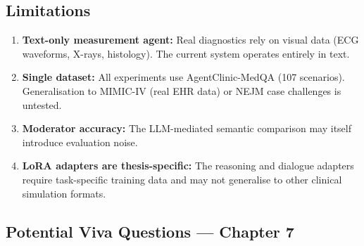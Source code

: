 \subsection{Limitations}

\begin{enumerate}
    \item \textbf{Text-only measurement agent:} Real diagnostics rely on visual data (ECG waveforms, X-rays, histology). The current system operates entirely in text.
    \item \textbf{Single dataset:} All experiments use AgentClinic-MedQA (107 scenarios). Generalisation to MIMIC-IV (real EHR data) or NEJM case challenges is untested.
    \item \textbf{Moderator accuracy:} The LLM-mediated semantic comparison may itself introduce evaluation noise.
    \item \textbf{LoRA adapters are thesis-specific:} The reasoning and dialogue adapters require task-specific training data and may not generalise to other clinical simulation formats.
\end{enumerate}

\subsection{Potential Viva Questions --- Chapter 7}

